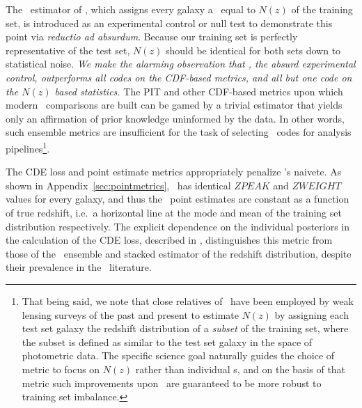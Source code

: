 The \trainz\ estimator of , which assigns every galaxy a \pzpdf\ equal to $N(z)$ of the training set, is introduced as an experimental control or null test to demonstrate this point via \textit{reductio ad absurdum}.
Because our training set is perfectly representative of the test set, $N(z)$ should be identical for both sets down to statistical noise.
\textit{We make the alarming observation that \trainz, the absurd experimental control, outperforms all codes on the CDF-based metrics, and all but one code on the $N(z)$ based statistics.}
The PIT and other CDF-based metrics upon which modern \pzpdf\ comparisons are built \citep{bordoloi_photo-z_2010,polsterer_dealing_2016,tanaka_photometric_2018} can be gamed by a trivial estimator that yields only an affirmation of prior knowledge uninformed by the data.
In other words, such ensemble metrics are insufficient for the task of selecting \pzpdf\ codes for analysis pipelines\footnote{That being said, we note that close relatives of \trainz\ have been employed by weak lensing surveys of the past and present \citep{lima_estimating_2008, hildebrandt_kids-450:_2017, hoyle_dark_2018} to estimate $N(z)$ by assigning each test set galaxy the redshift distribution of a \emph{subset} of the training set, where the subset is defined as similar to the test set galaxy in the space of photometric data.
The specific science goal naturally guides the choice of metric to focus on $N(z)$ rather than individual \pzpdf s, and on the basis of that metric such improvements upon \trainz\ are guaranteed to be more robust to training set imbalance.}.

The CDE loss and point estimate metrics appropriately penalize \trainz's naivete.
As shown in Appendix~\ref{sec:pointmetrics}, \trainz ~has identical $ZPEAK$ and $ZWEIGHT$ values for every galaxy, and thus the \pz\ point estimates are constant as a function of true redshift, i.e.~a horizontal line at the mode and mean of the training set distribution respectively.
The explicit dependence on the individual posteriors in the calculation of the CDE loss, described in , distinguishes this metric from those of the \pzpdf\ ensemble and stacked estimator of the redshift distribution, despite their prevalence in the \pz\ literature.

